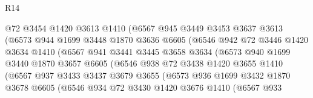 \begin{lexlean}{R14}
\begin{coremodule}
                        @72
                        @3454
                        @1420
                        @3613
                        @1410
                        (@6567
                          @945
                          @3449
                          @3453
                          @3637
                          @3613
                          (@6573
                            @944
                            @1699
                            @3448
                            @1870
                            @3636
                            @6605
                            (@6546
                              @942
                              @72
                              @3446
                              @1420
                              @3634
                              @1410
                              (@6567
                                @941
                                @3441
                                @3445
                                @3658
                                @3634
                                (@6573
                                  @940
                                  @1699
                                  @3440
                                  @1870
                                  @3657
                                  @6605
                                  (@6546
                                    @938
                                    @72
                                    @3438
                                    @1420
                                    @3655
                                    @1410
                                    (@6567
                                      @937
                                      @3433
                                      @3437
                                      @3679
                                      @3655
                                      (@6573
                                        @936
                                        @1699
                                        @3432
                                        @1870
                                        @3678
                                        @6605
                                        (@6546
                                          @934
                                          @72
                                          @3430
                                          @1420
                                          @3676
                                          @1410
                                          (@6567
                                            @933

\end{coremodule}
\end{lexlean}
